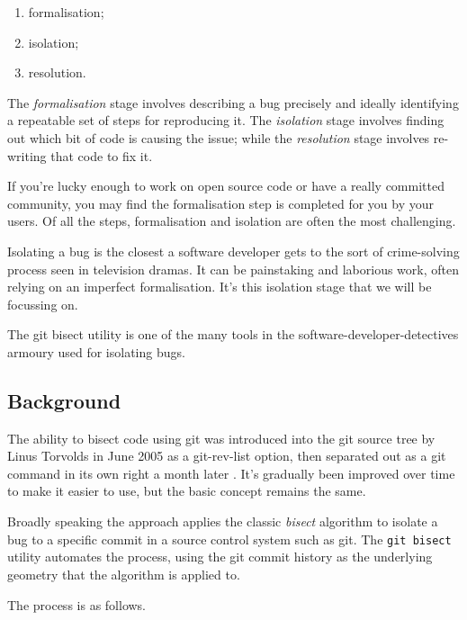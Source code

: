 \documentclass[10pt,journal,compsoc]{IEEEtran}
\begin{document}
\begin{enumerate}
\item formalisation;
\item isolation;
\item resolution.
\end{enumerate}

The {\it formalisation\/} stage involves describing a bug precisely and ideally identifying a repeatable set of steps for reproducing it. The {\it isolation\/} stage involves finding out which bit of code is causing the issue; while the {\it resolution\/} stage involves re-writing that code to fix it.

If you're lucky enough to work on open source code or have a really committed community, you may find the formalisation step is completed for you by your users. Of all the steps, formalisation and isolation are often the most challenging.

Isolating a bug is the closest a software developer gets to the sort of crime-solving process seen in television dramas. It can be painstaking and laborious work, often relying on an imperfect formalisation. It's this isolation stage that we will be focussing on.

The {\code git bisect} utility is one of the many tools in the software-developer-detectives armoury used for isolating bugs.

\subsection{Background}

The ability to bisect code using {\code git} was introduced into the {\code git} source tree by Linus Torvolds in June 2005 \cite{git-commit-8b3a1e056f21} as a {\code git-rev-list} option, then separated out as a {\code git} command in its own right a month later \cite{git-commit-8cc6a0831988}. It's gradually been improved over time to make it easier to use, but the basic concept remains the same.

Broadly speaking the approach applies the classic {\it bisect\/} algorithm to isolate a bug to a specific commit in a source control system such as git. The {\tt git bisect} utility automates the process, using the git commit history as the underlying geometry that the algorithm is applied to.

The process is as follows.
\end{document}
